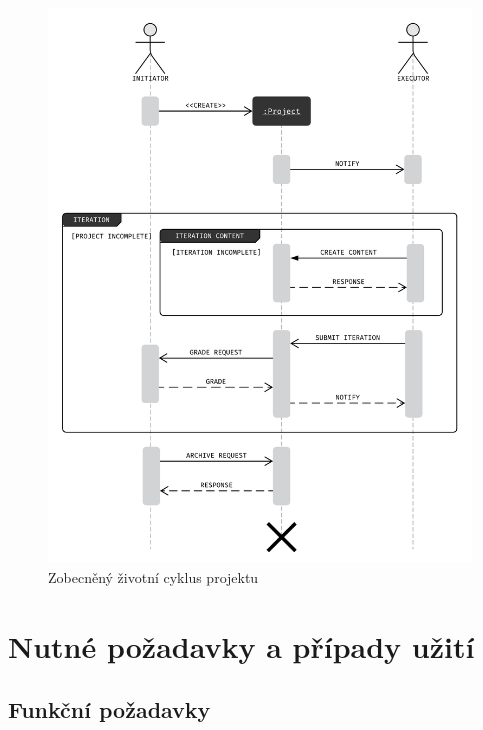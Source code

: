 \begin{figure}[htbp]
   \centering
   \includegraphics[max width=\textwidth]{assets/dia-seq-study-project-lifecycle}
   \caption[Zobecněný životní cyklus projektu]{Zobecněný životní cyklus projektu~\cite{bachelorthesis}}\label{fig:main-communication-cycle}
\end{figure}

\clearpage



\section{Nutné požadavky a případy užití}\label{sec:required-spec}



\subsection{Funkční požadavky}\label{subsec:spec-req-func}

